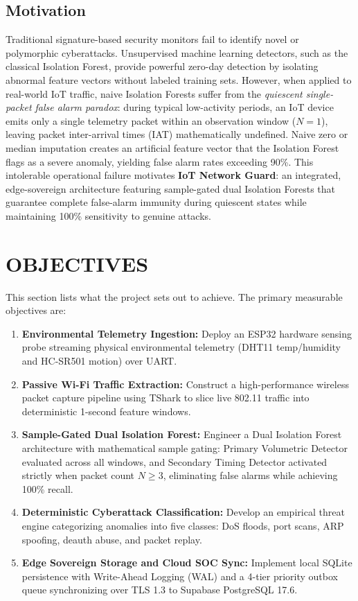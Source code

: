 \documentclass[11pt,a4paper]{report}
\begin{document}
\subsection{Motivation}
Traditional signature-based security monitors fail to identify novel or polymorphic cyberattacks. Unsupervised machine learning detectors, such as the classical Isolation Forest, provide powerful zero-day detection by isolating abnormal feature vectors without labeled training sets. However, when applied to real-world IoT traffic, naive Isolation Forests suffer from the \textit{quiescent single-packet false alarm paradox}: during typical low-activity periods, an IoT device emits only a single telemetry packet within an observation window ($N = 1$), leaving packet inter-arrival times (IAT) mathematically undefined. Naive zero or median imputation creates an artificial feature vector that the Isolation Forest flags as a severe anomaly, yielding false alarm rates exceeding 90\%. This intolerable operational failure motivates \textbf{IoT Network Guard}: an integrated, edge-sovereign architecture featuring sample-gated dual Isolation Forests that guarantee complete false-alarm immunity during quiescent states while maintaining 100\% sensitivity to genuine attacks.

\section{OBJECTIVES}
This section lists what the project sets out to achieve. The primary measurable objectives are:
\begin{enumerate}[leftmargin=*,itemsep=0.5pt,parsep=0pt,topsep=1pt]
    \item \textbf{Environmental Telemetry Ingestion:} Deploy an ESP32 hardware sensing probe streaming physical environmental telemetry (DHT11 temp/humidity and HC-SR501 motion) over UART.
    \item \textbf{Passive Wi-Fi Traffic Extraction:} Construct a high-performance wireless packet capture pipeline using TShark to slice live 802.11 traffic into deterministic 1-second feature windows.
    \item \textbf{Sample-Gated Dual Isolation Forest:} Engineer a Dual Isolation Forest architecture with mathematical sample gating: Primary Volumetric Detector evaluated across all windows, and Secondary Timing Detector activated strictly when packet count $N \ge 3$, eliminating false alarms while achieving 100\% recall.
    \item \textbf{Deterministic Cyberattack Classification:} Develop an empirical threat engine categorizing anomalies into five classes: DoS floods, port scans, ARP spoofing, deauth abuse, and packet replay.
    \item \textbf{Edge Sovereign Storage and Cloud SOC Sync:} Implement local SQLite persistence with Write-Ahead Logging (WAL) and a 4-tier priority outbox queue synchronizing over TLS 1.3 to Supabase PostgreSQL 17.6.
\end{enumerate}
\end{document}
